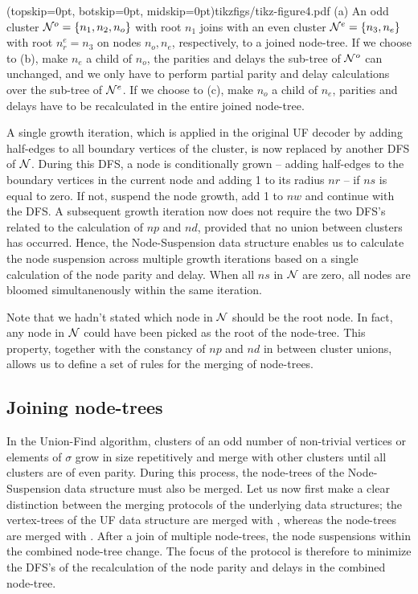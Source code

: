 \Figure[htb](topskip=0pt, botskip=0pt, midskip=0pt){tikzfigs/tikz-figure4.pdf}{
    (a) An odd cluster $\mathcal{N}^o=\{n_1, n_2, n_o\}$ with root $n_1$ joins with an even cluster $\mathcal{N}^e=\{n_3, n_e\}$ with root $n^e_r=n_3$ on nodes $n_o, n_e$, respectively, to a joined node-tree. If we choose to (b), make $n_e$ a child of $n_o$, the parities and delays the sub-tree of $\mathcal{N}^o$ can unchanged, and we only have to perform partial parity and delay calculations over the sub-tree of $\mathcal{N}^e$. If we choose to (c), make $n_o$ a child of $n_e$, parities and delays have to be recalculated in the entire joined node-tree. \label{fig4}}

A single growth iteration, which is applied in the original UF decoder by adding half-edges to all boundary vertices of the cluster, is now replaced by another DFS of $\mathcal{N}$. During this DFS, a node is conditionally grown -- adding half-edges to the boundary vertices in the current node and adding 1 to its radius $nr$ -- if $ns$ is equal to zero. If not, suspend the node growth, add 1 to $nw$ and continue with the DFS. A subsequent growth iteration now does not require the two DFS's related to the calculation of $np$ and $nd$, provided that no union between clusters has occurred. Hence, the Node-Suspension data structure enables us to calculate the node suspension across multiple growth iterations based on a single calculation of the node parity and delay. When all $ns$ in $\mathcal{N}$ are zero, all nodes are bloomed simultanenously within the same iteration. 

Note that we hadn't stated which node in $\mathcal{N}$ should be the root node. In fact, any node in $\mathcal{N}$ could have been picked as the root of the node-tree. This property, together with the constancy of $np$ and $nd$ in between cluster unions, allows us to define a set of rules for the merging of node-trees.  


\subsection{Joining node-trees}\label{sec:nodejoin}

In the Union-Find algorithm, clusters of an odd number of non-trivial vertices or elements of $\sigma$ grow in size repetitively and merge with other clusters until all clusters are of even parity. During this process, the node-trees of the Node-Suspension data structure must also be merged. Let us now first make a clear distinction between the merging protocols of the underlying data structures; the vertex-trees of the UF data structure are merged with , whereas the node-trees are merged with . After a join of multiple node-trees, the node suspensions within the combined node-tree change. The focus of the  protocol is therefore to minimize the DFS's of the recalculation of the node parity and delays in the combined node-tree. 

